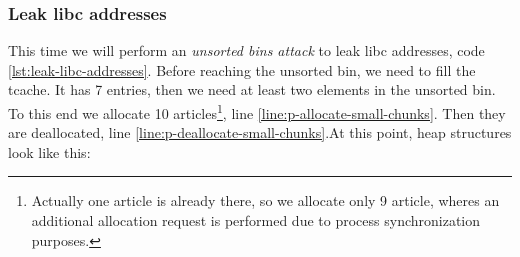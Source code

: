\documentclass{article}
\numberwithin{equation}{subsection}
\begin{document}
\subsubsection{Leak libc addresses}
This time we will perform an \emph{unsorted bins attack} to leak libc addresses, code \ref{lst:leak-libc-addresses}. Before reaching the unsorted bin, we need to fill the tcache. It has 7 entries, then we need at least two elements in the unsorted bin. To this end we allocate 10 articles\footnote{Actually one article is already there, so we allocate only 9 article, wheres an additional allocation request is performed due to process synchronization purposes.}, line \ref{line:p-allocate-small-chunks}. Then they are deallocated, line \ref{line:p-deallocate-small-chunks}.At this point, heap structures look like this:\newline
\end{document}
